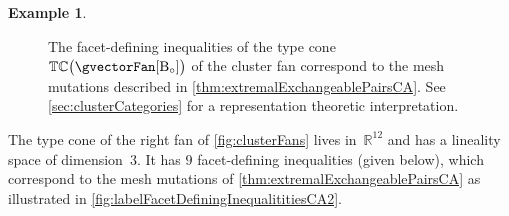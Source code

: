 \documentclass{amsart}
\theoremstyle{definition}
\newtheorem{example}[theorem]{Example}
\newcommand{\R}{\mathbb{R}} %
\newcommand{\typeCone}{\mathbb{TC}} %
\newcommand{\B}{\mathrm{B}} %
\begin{document}
\begin{example}
\begin{figure}[h]
\begin{adjustbox}{center}
    \end{adjustbox}
	\caption{The facet-defining inequalities of the type cone~$\typeCone \big( \gvectorFan[\B_\circ] \big)$ of the cluster fan correspond to the mesh mutations described in \cref{thm:extremalExchangeablePairsCA}. See \cref{sec:clusterCategories} for a representation theoretic \mbox{interpretation}.}
	\label{fig:labelFacetDefiningInequalititiesCA1}
\end{figure}

\noindent
The type cone of the right fan of \cref{fig:clusterFans} lives in~$\R^{12}$ and has a lineality space of dimension~$3$.
It has $9$ facet-defining inequalities (given below), which correspond to the mesh mutations of \cref{thm:extremalExchangeablePairsCA} as illustrated in \cref{fig:labelFacetDefiningInequalititiesCA2}.


\end{example}
\end{document}
